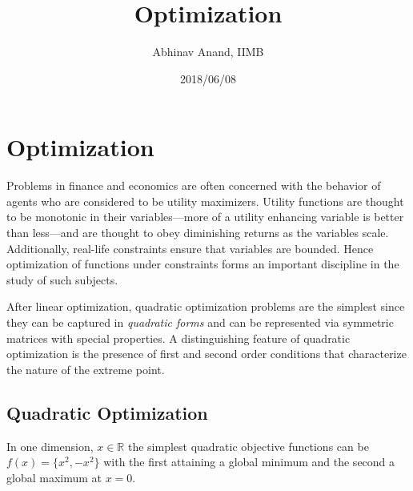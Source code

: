 \documentclass[11pt,]{article}
\title{Optimization}
\author{Abhinav Anand, IIMB}
\date{2018/06/08}
\begin{document}
\maketitle

\section{Optimization}\label{optimization}

Problems in finance and economics are often concerned with the behavior
of agents who are considered to be utility maximizers. Utility functions
are thought to be monotonic in their variables---more of a utility
enhancing variable is better than less---and are thought to obey
diminishing returns as the variables scale. Additionally, real-life
constraints ensure that variables are bounded. Hence optimization of
functions under constraints forms an important discipline in the study
of such subjects.

After linear optimization, quadratic optimization problems are the
simplest since they can be captured in \emph{quadratic forms} and can be
represented via symmetric matrices with special properties. A
distinguishing feature of quadratic optimization is the presence of
first and second order conditions that characterize the nature of the
extreme point.

\subsection{Quadratic Optimization}\label{quadratic-optimization}

In one dimension, \(x\in \mathbb{R}\) the simplest quadratic objective
functions can be \(f(x)=\{x^2, -x^2\}\) with the first attaining a
global minimum and the second a global maximum at \(x=0\).
\end{document}
